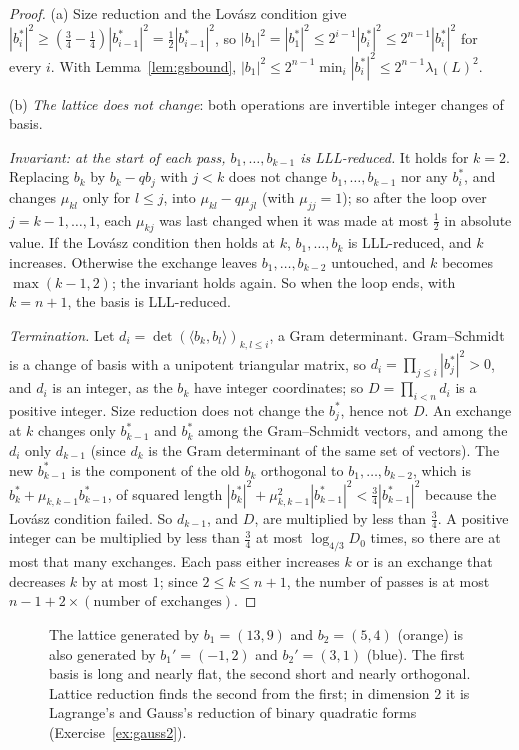 \begin{proof}
(a) Size reduction and the Lov\'asz condition give $|b_i^*|^2\ge(\frac34-\frac14)|b_{i-1}^*|^2=\frac12|b_{i-1}^*|^2$, so $|b_1|^2=|b_1^*|^2\le2^{i-1}|b_i^*|^2\le2^{n-1}|b_i^*|^2$ for every $i$. With
Lemma~\ref{lem:gsbound}, $|b_1|^2\le2^{n-1}\min_i|b_i^*|^2\le2^{n-1}\lambda_1(L)^2$.

(b) \emph{The lattice does not change}: both operations are invertible integer changes of basis.

\emph{Invariant: at the start of each pass, $b_1,\dots,b_{k-1}$ is LLL-reduced.} It holds for $k=2$. Replacing $b_k$ by $b_k-qb_j$ with $j<k$ does not change $b_1,\dots,b_{k-1}$ nor any $b_i^*$, and changes
$\mu_{kl}$ only for $l\le j$, into $\mu_{kl}-q\mu_{jl}$ (with $\mu_{jj}=1$); so after the loop over $j=k-1,\dots,1$, each $\mu_{kj}$ was last changed when it was made at most $\frac12$ in absolute value. If the Lov\'asz
condition then holds at $k$, $b_1,\dots,b_k$ is LLL-reduced, and $k$ increases. Otherwise the exchange leaves $b_1,\dots,b_{k-2}$ untouched, and $k$ becomes $\max(k-1,2)$; the invariant holds again. So when the
loop ends, with $k=n+1$, the basis is LLL-reduced.

\emph{Termination.} Let $d_i=\det(\langle b_k,b_l\rangle)_{k,l\le i}$, a Gram determinant. Gram--Schmidt is a change of basis with a unipotent triangular matrix, so $d_i=\prod_{j\le i}|b_j^*|^2>0$, and $d_i$
is an integer, as the $b_k$ have integer coordinates; so $D=\prod_{i<n}d_i$ is a positive integer. Size reduction does not change the $b_j^*$, hence not $D$. An exchange at $k$ changes only
$b_{k-1}^*$ and $b_k^*$ among the Gram--Schmidt vectors, and among the $d_i$ only $d_{k-1}$ (since $d_k$ is the Gram determinant of the same set of vectors). The new $b_{k-1}^*$ is the component of the old $b_k$
orthogonal to $b_1,\dots,b_{k-2}$, which is $b_k^*+\mu_{k,k-1}b_{k-1}^*$, of squared length $|b_k^*|^2+\mu_{k,k-1}^2|b_{k-1}^*|^2<\frac34|b_{k-1}^*|^2$ because the Lov\'asz condition failed. So $d_{k-1}$, and $D$, are multiplied
by less than $\frac34$. A positive integer can be multiplied by less than $\frac34$ at most $\log_{4/3}D_0$ times, so there are at most that many exchanges. Each pass either increases $k$ or
is an exchange that decreases $k$ by at most $1$; since $2\le k\le n+1$, the number of passes is at most $n-1+2\times(\text{number of exchanges})$.
\end{proof}

\begin{figure}[ht]
\centering
{}
\caption{The lattice generated by $b_1=(13,9)$ and $b_2=(5,4)$ (orange) is also generated by $b_1'=(-1,2)$ and $b_2'=(3,1)$ (blue). The first basis is long and nearly flat, the second
short and nearly orthogonal. Lattice reduction finds the second from the first; in dimension $2$ it is Lagrange's and Gauss's reduction of binary quadratic forms (Exercise~\ref{ex:gauss2}).}
\label{fig:lattice}
\end{figure}


